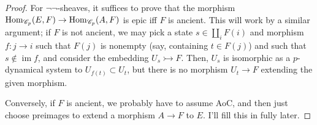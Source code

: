 \documentclass{amsart}
\begin{document}
{\begin{proof}
  For $\neg\neg$-sheaves, it suffices to prove that the morphism $\operatorname{Hom}_{\mathscr{C}_p}(E,F) \rightarrow \operatorname{Hom}_{\mathscr{C}_p}(A,F)$ is epic iff $F$ is ancient.
  This will work by a similar argument;
  if $F$ is not ancient, we may pick a state $s \in \coprod_i F(i)$ and morphism $f:j \rightarrow i$ such that $F(j)$ is nonempty (say, containing $t \in F(j)$) and such that $s \not\in \operatorname{im} f$, and consider the embedding $U_s \rightarrowtail F$.
  Then, $U_s$ is isomorphic as a $p$-dynamical system to $U_{f(t)} \subset U_t$, but there is no morphism $U_t \rightarrow F$ extending the given morphism.

  Conversely, if $F$ is ancient, we probably have to assume AoC, and then just choose preimages to extend a morphism $A \rightarrow F$ to $E$.
  I'll fill this in fully later.

   
\end{proof}
}
\end{document}
